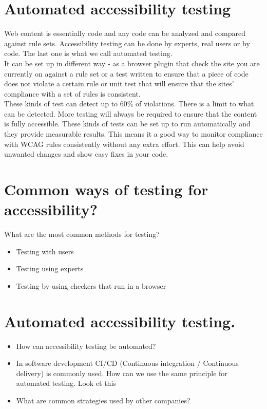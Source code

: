 \documentclass{master_thesis_section}
\begin{document}
\section{Automated accessibility testing}

Web content is essentially code and any code can be analyzed and compared against rule sets. Accessibility testing can be done by experts, real users or by code. The last one is what we call automated testing. \\
It can be set up in different way - as a browser plugin that check the site you are currently on against a rule set or a test written to ensure that a piece of code does not violate a certain rule or unit test that will ensure that the sites' compliance with a set of rules is consistent. \\
These kinds of test can detect up to 60\% of violations.
There is a limit to what can be detected. More testing will always be required to ensure that the content is fully accessible. These kinds of tests can be set up to run automatically and they provide measurable results. This means it a good way to monitor compliance with WCAG rules consistently without any extra effort. This can help avoid unwanted changes and show easy fixes in  your code.

\section{Common ways of testing for accessibility?}

\citep{Sane2021}
\citep{InitiativeWAIa}
\citep{WebAIM2019}

What are the most common methods for testing?

\begin{itemize}
	\item Testing with users
	\item Testing using experts
	\item Testing by using checkers that run in a browser
\end{itemize}

\section{Automated accessibility testing.}

\begin{itemize}
	\item How can accessibility testing be automated?
	\item In software development CI/CD (Continuous integration / Continuous delivery) is commonly used. How can we use the same principle for automated testing. Look et this \citep{}
	\item What are common strategies used by other companies?
\end{itemize}
\end{document}
